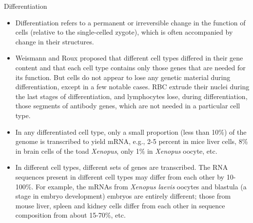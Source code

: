\documentclass[11pt,dvipsnames,ignorenonframetext,aspectratio=169]{beamer}
\providecommand{\tightlist}{%
  \setlength{\itemsep}{0pt}\setlength{\parskip}{0pt}}
\begin{document}
\begin{frame}{Differentiation}
\protect\hypertarget{differentiation}{}

\begin{itemize}
\tightlist
\item
  Differentiation refers to a permanent or irreversible change in the
  function of cells (relative to the single-celled zygote), which is
  often accompanied by change in their structures.
\item
  Weismann and Roux proposed that different cell types differed in their
  gene content and that each cell type contains only those genes that
  are needed for its function. But cells do not appear to lose any
  genetic material during differentiation, except in a few notable
  cases. RBC extrude their nuclei during the last stages of
  differentiation, and lymphocytes lose, during differentiation, those
  segments of antibody genes, which are not needed in a particular cell
  type.
\item
  In any differentiated cell type, only a small proportion (less than
  10\%) of the genome is transcribed to yield mRNA, e.g., 2-5 percent in
  mice liver cells, 8\% in brain cells of the toad \emph{Xenopus}, only
  1\% in \emph{Xenopus} oocyte, etc.
\end{itemize}

\end{frame}

\begin{frame}{}
\protect\hypertarget{section-3}{}

\begin{itemize}
\tightlist
\item
  In different cell types, different sets of genes are transcribed. The
  RNA sequences present in different cell types may differ from each
  other by 10-100\%. For example, the mRNAs from \emph{Xenopus laevis}
  oocytes and blastula (a stage in embryo development) embryos are
  entirely different; those from mouse liver, spleen and kidney cells
  differ from each other in sequence composition from about 15-70\%,
  etc.
\end{itemize}

\end{frame}
\end{document}
